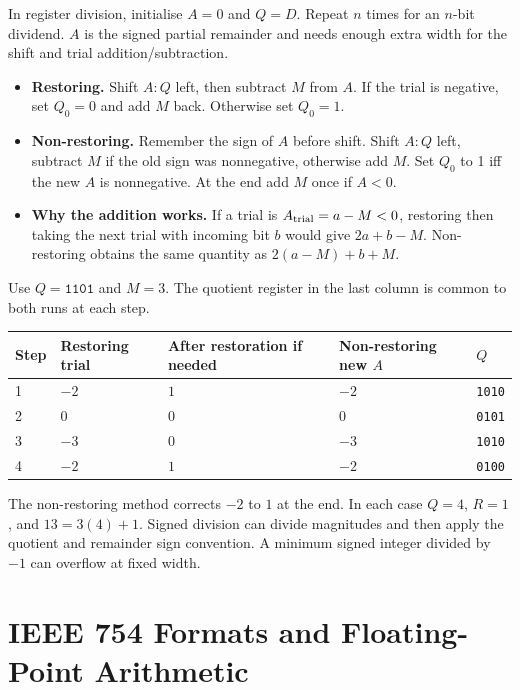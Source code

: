 \documentclass[12pt,a4paper]{article}
\begin{document}
In register division, initialise $A=0$ and $Q=D$. Repeat $n$ times for an $n$-bit dividend. $A$ is the signed partial remainder and needs enough extra width for the shift and trial addition/subtraction.
\begin{itemize}[leftmargin=*,itemsep=3pt]
\item \textbf{Restoring.} Shift $A:Q$ left, then subtract $M$ from $A$. If the trial is negative, set $Q_0=0$ and add $M$ back. Otherwise set $Q_0=1$.
\item \textbf{Non-restoring.} Remember the sign of $A$ before shift. Shift $A:Q$ left, subtract $M$ if the old sign was nonnegative, otherwise add $M$. Set $Q_0$ to 1 iff the new $A$ is nonnegative. At the end add $M$ once if $A<0$.
\item \textbf{Why the addition works.} If a trial is $A_{\rm trial}=a-M<0$, restoring then taking the next trial with incoming bit $b$ would give $2a+b-M$. Non-restoring obtains the same quantity as $2(a-M)+b+M$.
\end{itemize}
\begin{tcolorbox}[examplebox,title={Restoring and non-restoring traces for 13 divided by 3}]
Use $Q=\texttt{1101}$ and $M=3$. The quotient register in the last column is common to both runs at each step.
\par\vspace{6pt}\noindent
\begin{tabularx}{\linewidth}{|B{1.1cm}|Y|Y|Y|B{1.6cm}|}\hline
Step & Restoring trial & After restoration if needed & Non-restoring new $A$ & $Q$ \\  & $-2$ & $1$ & $-2$ & \texttt{1010} \\  & $0$ & $0$ & $0$ & \texttt{0101} \\  & $-3$ & $0$ & $-3$ & \texttt{1010} \\  & $-2$ & $1$ & $-2$ & \texttt{0100} \\ \hline
\end{tabularx}

The non-restoring method corrects $-2$ to $1$ at the end. In each case $Q=4$, $R=1$, and $13=3(4)+1$. Signed division can divide magnitudes and then apply the quotient and remainder sign convention. A minimum signed integer divided by $-1$ can overflow at fixed width.
\end{tcolorbox}

\section{IEEE 754 Formats and Floating-Point Arithmetic}
\end{document}

